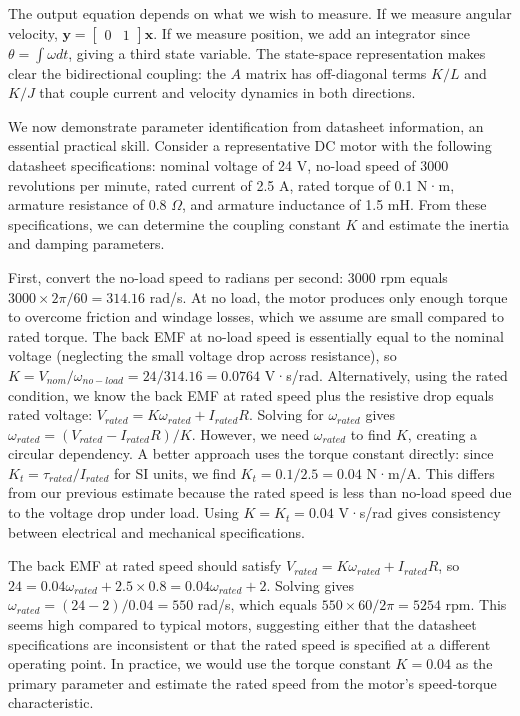 The output equation depends on what we wish to measure. If we measure angular velocity, $\mathbf{y} = \begin{bmatrix} 0 & 1 \end{bmatrix} \mathbf{x}$. If we measure position, we add an integrator since $\theta = \int \omega dt$, giving a third state variable. The state-space representation makes clear the bidirectional coupling: the $A$ matrix has off-diagonal terms $K/L$ and $K/J$ that couple current and velocity dynamics in both directions.

We now demonstrate parameter identification from datasheet information, an essential practical skill. Consider a representative DC motor with the following datasheet specifications: nominal voltage of 24 V, no-load speed of 3000 revolutions per minute, rated current of 2.5 A, rated torque of 0.1 N·m, armature resistance of 0.8 $\Omega$, and armature inductance of 1.5 mH. From these specifications, we can determine the coupling constant $K$ and estimate the inertia and damping parameters.

First, convert the no-load speed to radians per second: 3000 rpm equals $3000 \times 2\pi / 60 = 314.16$ rad/s. At no load, the motor produces only enough torque to overcome friction and windage losses, which we assume are small compared to rated torque. The back EMF at no-load speed is essentially equal to the nominal voltage (neglecting the small voltage drop across resistance), so $K = V_{nom} / \omega_{no-load} = 24 / 314.16 = 0.0764$ V·s/rad. Alternatively, using the rated condition, we know the back EMF at rated speed plus the resistive drop equals rated voltage: $V_{rated} = K \omega_{rated} + I_{rated} R$. Solving for $\omega_{rated}$ gives $\omega_{rated} = (V_{rated} - I_{rated} R) / K$. However, we need $\omega_{rated}$ to find $K$, creating a circular dependency. A better approach uses the torque constant directly: since $K_t = \tau_{rated} / I_{rated}$ for SI units, we find $K_t = 0.1 / 2.5 = 0.04$ N·m/A. This differs from our previous estimate because the rated speed is less than no-load speed due to the voltage drop under load. Using $K = K_t = 0.04$ V·s/rad gives consistency between electrical and mechanical specifications.

The back EMF at rated speed should satisfy $V_{rated} = K \omega_{rated} + I_{rated} R$, so $24 = 0.04 \omega_{rated} + 2.5 \times 0.8 = 0.04 \omega_{rated} + 2$. Solving gives $\omega_{rated} = (24 - 2) / 0.04 = 550$ rad/s, which equals $550 \times 60 / 2\pi = 5254$ rpm. This seems high compared to typical motors, suggesting either that the datasheet specifications are inconsistent or that the rated speed is specified at a different operating point. In practice, we would use the torque constant $K = 0.04$ as the primary parameter and estimate the rated speed from the motor's speed-torque characteristic.

